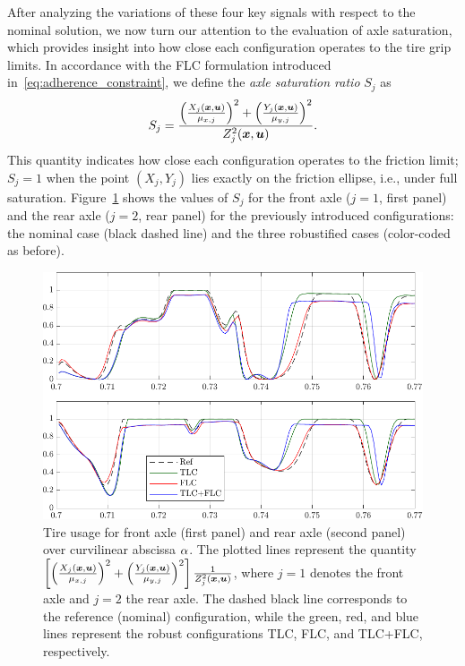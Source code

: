 After analyzing the variations of these four key signals with respect to the nominal solution, we now turn our attention to the evaluation of axle saturation, which provides insight into how close each configuration operates to the tire grip limits.
In accordance with the FLC formulation introduced in~\eqref{eq:adherence_constraint}, we define the \emph{axle saturation ratio} $S_j$ as
\begin{equation}
	S_j = \frac{ \left( \frac{X_j(\boldsymbol{x},\boldsymbol{u})}{\mu_{x,j}} \right)^2+ \left( \frac{Y_j(\boldsymbol{x},\boldsymbol{u})}{\mu_{y,j}}\right)^2}{Z_j^2(\boldsymbol{x},\boldsymbol{u})}.
\end{equation}
This quantity indicates how close each configuration operates to the friction limit; $S_j = 1$ when the point $\left(X_j, Y_j\right)$ lies exactly on the friction ellipse, i.e., under full saturation.
Figure~\ref{fig:ol_saturation} shows the values of $S_j$ for the front axle ($j=1$, first panel) and the rear axle ($j=2$, rear panel) for the previously introduced configurations: the nominal case (black dashed line) and the three robustified cases (color-coded as before).

\begin{figure}
	\centering
	\includegraphics{Fig/ol_saturation.pdf}
	\caption{Tire usage for front axle (first panel) and rear axle (second panel) over curvilinear abscissa $\alpha$. The plotted lines represent the quantity $\left[ \left( \frac{X_j(\boldsymbol{x},\boldsymbol{u})}{\mu_{x,j}} \right)^2+ \left( \frac{Y_j(\boldsymbol{x},\boldsymbol{u})}{\mu_{y,j}}\right)^2\right]\frac{1}{Z_j^2(\boldsymbol{x},\boldsymbol{u})}$, where $j=1$ denotes the front axle and $j=2$ the rear axle. The dashed black line corresponds to the reference (nominal) configuration, while the green, red, and blue lines represent the robust configurations TLC, FLC, and TLC+FLC, respectively.}
	\label{fig:ol_saturation}
\end{figure}

